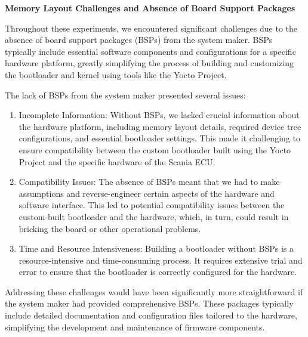 \textbf{Memory Layout Challenges and Absence of Board Support Packages}

Throughout these experiments, we encountered significant challenges due to the absence of board support packages (BSPs) from the system maker. BSPs typically include essential software components and configurations for a specific hardware platform, greatly simplifying the process of building and customizing the bootloader and kernel using tools like the Yocto Project.

The lack of BSPs from the system maker presented several issues:
\begin{enumerate}
	\item Incomplete Information: Without BSPs, we lacked crucial information about the hardware platform, including memory layout details, required device tree configurations, and essential bootloader settings. This made it challenging to ensure compatibility between the custom bootloader built using the Yocto Project and the specific hardware of the Scania ECU.
	\item Compatibility Issues: The absence of BSPs meant that we had to make assumptions and reverse-engineer certain aspects of the hardware and software interface. This led to potential compatibility issues between the custom-built bootloader and the hardware, which, in turn, could result in bricking the board or other operational problems.
	\item Time and Resource Intensiveness: Building a bootloader without BSPs is a resource-intensive and time-consuming process. It requires extensive trial and error to ensure that the bootloader is correctly configured for the hardware.
\end{enumerate}

Addressing these challenges would have been significantly more straightforward if the system maker had provided comprehensive BSPs. These packages typically include detailed documentation and configuration files tailored to the hardware, simplifying the development and maintenance of firmware components.
